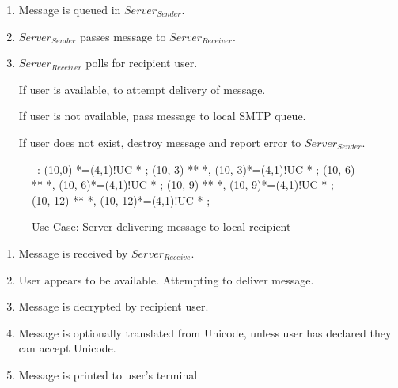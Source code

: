 \begin{enumerate}

\item Message is queued in $Server_{Sender}$.

\item $Server_{Sender}$ passes message to $Server_{Receiver}$.

\item $Server_{Receiver}$ polls for recipient user. 

\subitem If user is available, to attempt delivery of message. 

\subitem If user is not available, pass message to local SMTP queue. 

\subitem If user does not exist, destroy message and report error to $Server_{Sender}$.

\end{enumerate}


\begin{figure}[h]

\small

\begin{center}

\ \xy<1cm,0cm>:
(10,0) *=(4,1)!UC *\frm{-} ;
(10,-3) **\dir{-} *\dir{>},
(10,-3)*=(4,1)!UC *\frm{-} ; 
(10,-6) **\dir{-} *\dir{>},
(10,-6)*=(4,1)!UC *\frm{--} ; 
(10,-9) **\dir{-} *\dir{>},
(10,-9)*=(4,1)!UC *\frm{--} ; 
(10,-12) **\dir{-} *\dir{>},
(10,-12)*=(4,1)!UC *\frm{-} ; 
\endxy

\end{center}

\caption{Use Case: Server delivering message to local recipient}

\end{figure}


\begin{enumerate}

\item Message is received by $Server_{Receive}$.

\item User appears to be available. Attempting to deliver message.

\item Message is decrypted by recipient user. 

\item Message is optionally translated from Unicode, unless user has
declared they can accept Unicode. 

\item Message is printed to user's terminal

\end{enumerate}

\vfill

